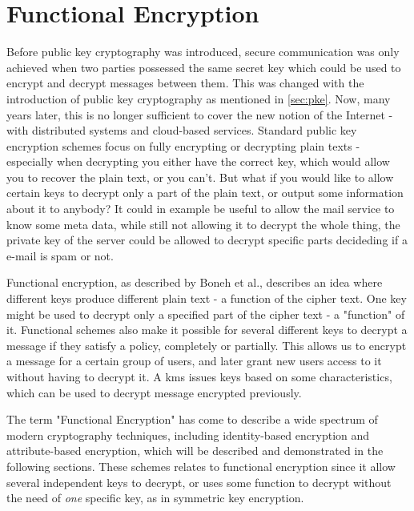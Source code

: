 \section{Functional Encryption}
Before public key cryptography was introduced, secure communication was only achieved when two parties possessed the same secret key which could be used to encrypt and decrypt messages between them. This was changed with the introduction of public key cryptography as mentioned in \ref{sec:pke}. Now, many years later, this is no longer sufficient to cover the new notion of the Internet - with distributed systems and cloud-based services. Standard public key encryption schemes focus on fully encrypting or decrypting plain texts - especially when decrypting you either have the correct key, which would allow you to recover the plain text, or you can’t. But what if you would like to allow certain keys to decrypt only a part of the plain text, or output some information about it to anybody? It could in example be useful to allow the mail service to know some meta data, while still not allowing it to decrypt the whole thing, the private key of the server could be allowed to decrypt specific parts decideding if a e-mail is spam or not.
\par Functional encryption, as described by Boneh et al.\cite{boneh2012functional}, describes an idea where different keys produce different plain text - a function of the cipher text. One key might be used to decrypt only a specified part of the cipher text - a "function" of it. Functional schemes also make it possible for several different keys to decrypt a message if they satisfy a policy, completely or partially. This allows us to encrypt a message for a certain group of users, and later grant new users access to it without having to decrypt it. A \gls{kms} issues keys based on some characteristics, which can be used to decrypt message encrypted previously. 
\par The term "Functional Encryption" has come to describe a wide spectrum of modern cryptography techniques, including identity-based encryption and attribute-based encryption, which will be described and demonstrated in the following sections. These schemes relates to functional encryption since it allow several independent keys to decrypt, or uses some function to decrypt without the need of \emph{one} specific key, as in symmetric key encryption.



